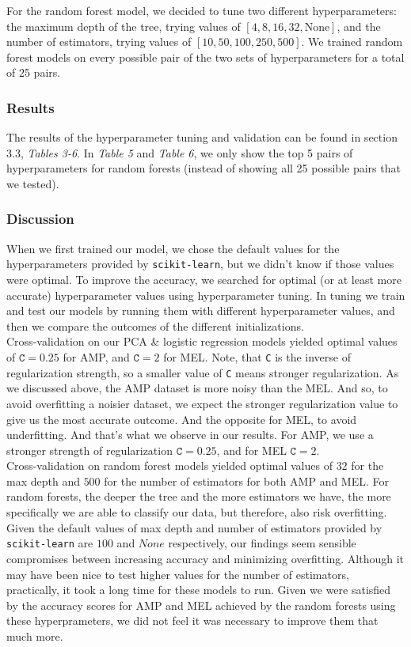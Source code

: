 \documentclass[11pt]{article}
\begin{document}
\noindent For the random forest model, we decided to tune two different hyperparameters: the maximum depth of the tree, trying values of $[4, 8, 16, 32, \text{None}]$, and the number of estimators, trying values of $[10, 50, 100, 250, 500]$. We trained random forest models on every possible pair of the two sets of hyperparameters for a total of 25 pairs.

\subsubsection{Results}
The results of the hyperparameter tuning and validation can be found in section 3.3, \textit{Tables 3-6}. In \textit{Table 5} and \textit{Table 6}, we only show the top 5 pairs of hyperparameters for random forests (instead of showing all 25 possible pairs that we tested).

\subsubsection{Discussion}
When we first trained our model, we chose the default values for the hyperparameters provided by \texttt{scikit-learn}, but we didn't know if those values were optimal. To improve the accuracy, we searched for optimal (or at least more accurate) hyperparameter values using hyperparameter tuning. In tuning we train and test our models by running them with different hyperparameter values, and then we compare the outcomes of the different initializations.\\

\noindent Cross-validation on our PCA \& logistic regression  models yielded optimal values of $\texttt{C}=0.25$ for AMP, and $\texttt{C}=2$ for MEL. Note, that \texttt{C} is the inverse of regularization strength, so a smaller value of \texttt{C} means stronger regularization. As we discussed above, the AMP dataset is more noisy than the MEL. And so, to avoid overfitting a noisier dataset, we expect the stronger regularization value to give us the most accurate outcome. And the opposite for MEL, to avoid underfitting. And that's what we observe in our results. For AMP, we use a stronger strength of regularization $\texttt{C}=0.25$, and for MEL $\texttt{C}=2$.\\

\noindent Cross-validation on random forest models yielded optimal values of $32$ for the max depth and $500$ for the number of estimators for both AMP and MEL. For random forests, the deeper the tree and the more estimators we have, the more specifically we are able to classify our data, but therefore, also risk overfitting. Given the default values of max depth and number of estimators provided by \texttt{scikit-learn} are $100$ and $None$ respectively, our findings seem sensible compromises between increasing accuracy and minimizing overfitting. Although it may have been nice to test higher values for the number of estimators, practically, it took a long time for these models to run. Given we were satisfied by the accuracy scores for AMP and MEL achieved by the random forests using these hyperprameters, we did not feel it was necessary to improve them that much more.
\end{document}
